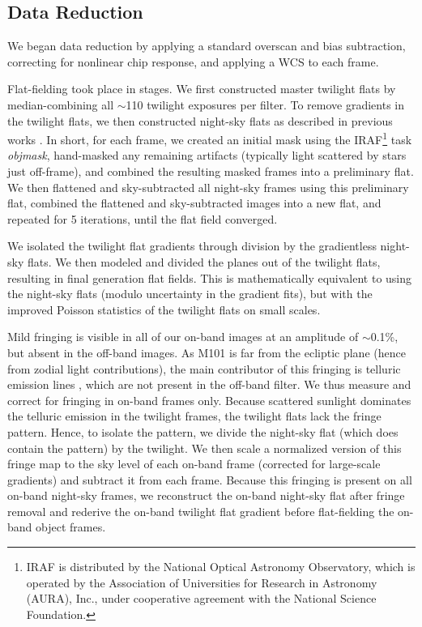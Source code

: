 \documentclass[iop]{emulateapj}
\begin{document}
\subsection{Data Reduction}

We began data reduction by applying a standard overscan and bias
subtraction, correcting for nonlinear chip response, and applying a
WCS to each frame.

Flat-fielding took place in stages.  We first constructed master
twilight flats by median-combining all $\sim$110 twilight exposures
per filter.  To remove gradients in the twilight flats, we then
constructed night-sky flats as described in previous works
\citep{watkins14, mihos17}. In short, for each frame, we created an
initial mask using the IRAF\footnote{IRAF is distributed by the
  National Optical Astronomy Observatory, which is operated by the
  Association of Universities for Research in Astronomy (AURA), Inc.,
  under cooperative agreement with the National Science Foundation.}
task \emph{objmask}, hand-masked any remaining artifacts (typically
light scattered by stars just off-frame), and combined the resulting
masked frames into a preliminary flat.  We then flattened and
sky-subtracted all night-sky frames using this preliminary flat,
combined the flattened and sky-subtracted images into a new flat, and
repeated for 5 iterations, until the flat field converged.

We isolated the twilight flat gradients through division by the
gradientless night-sky flats.  We then modeled and divided the planes
out of the twilight flats, resulting in final generation flat
fields.  This is mathematically equivalent to using the night-sky
flats (modulo uncertainty in the gradient fits), but with the improved
Poisson statistics of the twilight flats on small scales.

Mild fringing is visible in all of our on-band images at an amplitude
of $\sim$0.1\%, but absent in the off-band images.  As M101 is far
from the ecliptic plane (hence from zodial light contributions), the
main contributor of this fringing is telluric emission lines
\citep[OH;][]{massey00}, which are not present in the off-band filter.
We thus measure and correct for fringing in on-band frames only.
Because scattered sunlight dominates the telluric emission in the
twilight frames, the twilight flats lack the fringe pattern.  Hence,
to isolate the pattern, we divide the night-sky flat (which does
contain the pattern) by the twilight.  We then scale a normalized
version of this fringe map to the sky level of each on-band frame
(corrected for large-scale gradients) and subtract it from each frame.
Because this fringing is present on all on-band night-sky frames, we
reconstruct the on-band night-sky flat after fringe removal and
rederive the on-band twilight flat gradient before flat-fielding the
on-band object frames.
\end{document}
